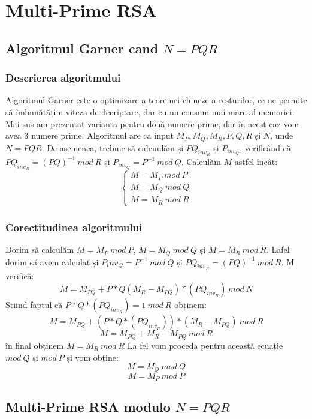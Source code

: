 \documentclass[12]{report}
\begin{document}
	    \section{Multi-Prime RSA}
	     \subsection{Algoritmul Garner cand $N=PQR$}
	     \subsubsection{Descrierea algoritmului}
	     Algoritmul Garner este o optimizare a teoremei chineze a resturilor, ce ne permite să îmbunătățim viteza de decriptare, dar cu un consum mai mare al memoriei. Mai sus am prezentat varianta pentru două numere prime, dar în acest caz vom avea $3$ numere prime. Algoritmul are ca input $M_P,M_Q,M_R,P,Q,R$ și $N$, unde $N=PQR$. De asemenea, trebuie să calcuulăm și $PQ_{inv_R}$ și $P_{inv_Q}$, verificând că $PQ_{inv_R}=(PQ)^{-1} \ mod \ R$ și $P_{inv_Q}=P^{-1} \ mod \ Q$. Calculăm $M$ astfel încât: \\
	         \[
\left\{ 
\begin{array}{c}
M=M_P \ mod \ P \\ 
M=M_Q \ mod \ Q \\ 
M=M_R \ mod \ R
\end{array}
\right. 
\]

		\subsubsection{Corectitudinea algoritmului}
		Dorim să calculăm $M=M_P \ mod \ P$, $M=M_Q \ mod \ Q $ și $M=M_R \ mod \ R $. Lafel dorim să avem calculat și $P_inv_Q=P^{-1} \ mod  \ Q$ și $PQ_{inv_R}=(PQ)^{-1} \ mod \ R$. M verifică: 
		$$M=M_{PQ} + P*Q(M_R-M_{PQ})*(PQ_{inv_R}) \ mod \ N$$
		Știind faptul că  $P*Q*(PQ_{inv_R})=1 \ mod \ R$ obținem:
		$$M=M_{PQ}+(P*Q*(PQ_{inv_R}))*(M_R-M_{PQ}) \ mod \ R$$
		$$M=M_{PQ} + M_R - M_{PQ} \ mod \ R$$
		în final obținem $ M=M_R \ mod \ R $
		La fel vom proceda pentru această ecuație $mod \ Q$ și $mod \ P$ și vom obține:
		$$M=M_Q \ mod \ Q$$
		$$M=M_P \ mod \ P$$
		
		\subsection{Multi-Prime RSA modulo $N=PQR$}
\end{document}
